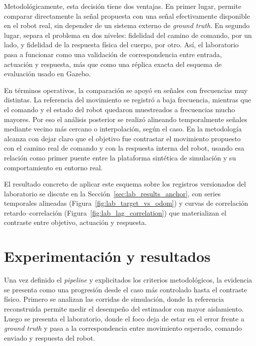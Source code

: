 \documentclass[12pt,a4paper]{report}
\begin{document}
Metodológicamente, esta decisión tiene dos ventajas. En primer lugar, permite
comparar directamente la señal propuesta con una señal efectivamente disponible
en el robot real, sin depender de un sistema externo de \textit{ground truth}. En
segundo lugar, separa el problema en dos niveles: fidelidad del camino de
comando, por un lado, y fidelidad de la respuesta física del cuerpo, por otro.
Así, el laboratorio pasa a funcionar como una validación de correspondencia
entre entrada, actuación y respuesta, más que como una réplica exacta del
esquema de evaluación usado en Gazebo.

En términos operativos, la comparación se apoyó en señales con frecuencias muy
distintas. La referencia del movimiento se registró a baja frecuencia, mientras
que el comando y el estado del robot quedaron muestreados a frecuencias mucho
mayores. Por eso el análisis posterior se realizó alineando temporalmente
señales mediante vecino más cercano o interpolación, según el caso. En la
metodología alcanza con dejar claro que el objetivo fue contrastar el movimiento
propuesto con el camino real de comando y con la respuesta interna del robot,
usando esa relación como primer puente entre la plataforma sintética de
simulación y su comportamiento en entorno real.

El resultado concreto de aplicar este esquema sobre los registros versionados
del laboratorio se discute en la Sección~\ref{sec:lab_results_anchor}, con
series temporales alineadas (Figura~\ref{fig:lab_target_vs_odom}) y curvas de
correlación retardo--correlación (Figura~\ref{fig:lab_lag_correlation}) que
materializan el contraste entre objetivo, actuación y respuesta.





\chapter{Experimentación y resultados} \label{sec:experimentacion}

Una vez definido el \textit{pipeline} y explicitados los criterios metodológicos, la
evidencia se presenta como una progresión desde el caso más controlado hasta el
contraste físico. Primero se analizan las corridas de simulación, donde la
referencia reconstruida permite medir el desempeño del estimador con mayor
aislamiento. Luego se presenta el laboratorio, donde el foco deja de estar en
el error frente a \textit{ground truth} y pasa a la correspondencia entre movimiento
esperado, comando enviado y respuesta del robot.
\end{document}
